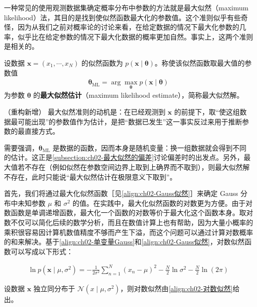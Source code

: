 \documentclass[../../main.tex]{subfiles}
\begin{document}
一种常见的使用观测数据集确定概率分布中参数的方法就是最大似然（maximum likelihood）法，其目的是找到使似然函数最大化的参数值。这个准则似乎有些奇怪，因为从我们之前对概率论的讨论来看，在给定数据的情况下最大化参数的几率，似乎比在给定参数的情况下最大化数据的概率更加自然。事实上，这两个准则是相关的。

\begin{definition}[最大似然估计]\label{definition:ch02-最大似然估计}
设数据 $\mathbf{x}=(x_1,\cdots,x_N)$ 的似然函数为 $p(\mathbf{x}\mid\boldsymbol{\theta})$。称使该似然函数取最大值的参数值
\begin{align*}
  \boldsymbol{\theta}_{\mathrm{ML}} = \arg\max_{\boldsymbol{\theta}} p(\mathbf{x}\mid\boldsymbol{\theta})
\end{align*}
为参数 $\boldsymbol{\theta}$ 的\textbf{最大似然估计}（maximum likelihood estimate），简称最大似然解。
\end{definition}

\begin{remark}（重构新增）
最大似然准则的动机是：在已经观测到 $\mathbf{x}$ 的前提下，取“使这组数据最可能出现”的参数值作为估计，是把“数据已发生”这一事实反过来用于推断参数的最直接方式。

需要强调，$\boldsymbol{\theta}_{\mathrm{ML}}$ 是数据的函数，因而本身是随机变量：换一组数据就会得到不同的估计。这正是\cref{subsection:ch02-最大似然的偏差}讨论偏差时的出发点。另外，最大值若不存在（例如似然在参数空间边界上取到上确界而不取到），则最大似然解不存在，此时只能说“最大似然估计在极限意义下取到”。
\end{remark}

首先，我们将通过最大化似然函数［见\eqref{align:ch02-Gauss似然}］来确定 Gauss 分布中未知参数 $\mu$ 和 $\sigma^{2}$ 的值。在实践中，最大化似然函数的对数更为方便。由于对数函数是单调递增函数，最大化一个函数的对数等价于最大化这个函数本身。取对数不仅可以简化后续的数学分析，而且在数值计算上也有帮助，因为大量小概率的乘积很容易因计算机数值精度不够而产生下溢，而这个问题可以通过计算对数概率的和来解决。基于\eqref{align:ch02-单变量Gauss}和\eqref{align:ch02-Gauss似然}，对数似然函数可以写成以下形式：

\begin{align}
  \ln p(\mathbf{x}\mid\mu,\sigma^{2}) = -\frac{1}{2\sigma^{2}}\sum_{n=1}^{N}(x_n-\mu)^{2} - \frac{N}{2}\ln\sigma^{2} - \frac{N}{2}\ln(2\pi)
  \label{align:ch02-对数似然}
\end{align}

\begin{proposition}\label{proposition:ch02-对数似然}
设数据 $\mathbf{x}$ 独立同分布于 $\mathcal{N}(x\mid\mu,\sigma^{2})$，则对数似然由\eqref{align:ch02-对数似然}给出。
\end{proposition}
\end{document}
